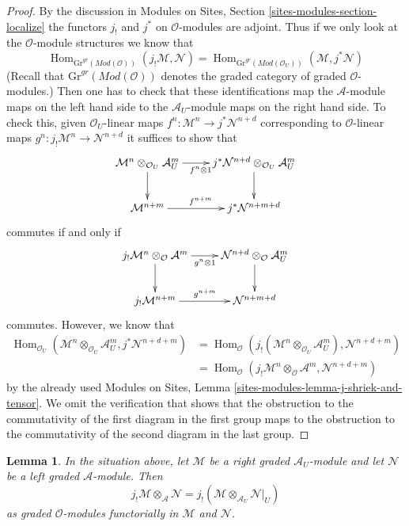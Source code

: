 \documentclass{stacks-project}
\theoremstyle{plain}
\newtheorem{lemma}[subsection]{Lemma}
\theoremstyle{definition}
\theoremstyle{remark}
\numberwithin{equation}{subsection}
\def\Hom{\mathop{\mathrm{Hom}}\nolimits}
\begin{document}
\begin{proof}
By the discussion in
Modules on Sites, Section \ref{sites-modules-section-localize}
the functors $j_!$ and $j^*$ on $\mathcal{O}$-modules are adjoint.
Thus if we only look at the $\mathcal{O}$-module structures
we know that
$$
\Hom_{\text{Gr}^{gr}(\textit{Mod}(\mathcal{O}))}(
j_!\mathcal{M}, \mathcal{N}) =
\Hom_{\text{Gr}^{gr}(\textit{Mod}(\mathcal{O}_U))}(
\mathcal{M}, j^*\mathcal{N})
$$
(Recall that $\text{Gr}^{gr}(\textit{Mod}(\mathcal{O}))$ denotes
the graded category of graded $\mathcal{O}$-modules.)
Then one has to check that these identifications map the
$\mathcal{A}$-module maps on the left hand side to the
$\mathcal{A}_U$-module maps on the right hand side.
To check this, given $\mathcal{O}_U$-linear maps
$f^n : \mathcal{M}^n \to j^*\mathcal{N}^{n + d}$
corresponding to $\mathcal{O}$-linear maps
$g^n : j_!\mathcal{M}^n \to \mathcal{N}^{n + d}$
it suffices to show that
$$
\xymatrix{
\mathcal{M}^n \otimes_{\mathcal{O}_U} \mathcal{A}_U^m
\ar[r]_{f^n \otimes 1} \ar[d] &
j^*\mathcal{N}^{n + d} \otimes_{\mathcal{O}_U} \mathcal{A}_U^m \ar[d] \\
\mathcal{M}^{n + m} \ar[r]^{f^{n + m}} &
j^*\mathcal{N}^{n + m + d}
}
$$
commutes if and only if
$$
\xymatrix{
j_!\mathcal{M}^n \otimes_\mathcal{O} \mathcal{A}^m
\ar[r]_{g^n \otimes 1} \ar[d] &
\mathcal{N}^{n + d} \otimes_\mathcal{O} \mathcal{A}_U^m \ar[d] \\
j_!\mathcal{M}^{n + m} \ar[r]^{g^{n + m}} &
\mathcal{N}^{n + m + d}
}
$$
commutes. However, we know that
\begin{align*}
\Hom_{\mathcal{O}_U}(\mathcal{M}^n \otimes_{\mathcal{O}_U} \mathcal{A}_U^m,
j^*\mathcal{N}^{n + d + m})
& =
\Hom_\mathcal{O}(j_!(\mathcal{M}^n \otimes_{\mathcal{O}_U} \mathcal{A}_U^m),
\mathcal{N}^{n + d + m}) \\
& =
\Hom_\mathcal{O}(j_!\mathcal{M}^n \otimes_\mathcal{O} \mathcal{A}^m,
\mathcal{N}^{n + d + m})
\end{align*}
by the already used
Modules on Sites, Lemma \ref{sites-modules-lemma-j-shriek-and-tensor}.
We omit the verification that shows that the obstruction to the
commutativity of the first diagram in the first group maps
to the obstruction to the commutativity of the second diagram
in the last group.
\end{proof}

\begin{lemma}
\label{lemma-tensor-with-extension-by-zero}
In the situation above, let $\mathcal{M}$ be a right graded
$\mathcal{A}_U$-module and let $\mathcal{N}$ be a left graded
$\mathcal{A}$-module. Then
$$
j_!\mathcal{M} \otimes_\mathcal{A} \mathcal{N} =
j_!(\mathcal{M} \otimes_{\mathcal{A}_U} \mathcal{N}|_U)
$$
as graded $\mathcal{O}$-modules functorially in $\mathcal{M}$
and $\mathcal{N}$.
\end{lemma}
\end{document}
